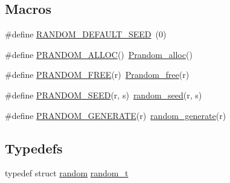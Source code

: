 \subsection*{Macros}
\begin{DoxyCompactItemize}
\item 
\#define \hyperlink{rstm_2rstm-dev_2stamp-0_89_810_2lib_2random_8h_abdb3a124cd7a9321b52cfb9ab44eb3a7}{R\-A\-N\-D\-O\-M\-\_\-\-D\-E\-F\-A\-U\-L\-T\-\_\-\-S\-E\-E\-D}~(0)
\item 
\#define \hyperlink{rstm_2rstm-dev_2stamp-0_89_810_2lib_2random_8h_a78ac6f10caa68d5d98a8b34620a2fade}{P\-R\-A\-N\-D\-O\-M\-\_\-\-A\-L\-L\-O\-C}()~\hyperlink{rstm_2rstm-dev_2stamp-0_89_810_2lib_2random_8h_a23ba58fb29a27e4f5801b2be7b93f0d1}{Prandom\-\_\-alloc}()
\item 
\#define \hyperlink{rstm_2rstm-dev_2stamp-0_89_810_2lib_2random_8h_af42b828b226fd9e7032cc4e4f02e1bda}{P\-R\-A\-N\-D\-O\-M\-\_\-\-F\-R\-E\-E}(r)~\hyperlink{rstm_2rstm-dev_2stamp-0_89_810_2lib_2random_8h_a64d899bb4c137344353c4e0d17bbc61f}{Prandom\-\_\-free}(r)
\item 
\#define \hyperlink{rstm_2rstm-dev_2stamp-0_89_810_2lib_2random_8h_adfeee31d6ffe735494791d7c3d8d5fbd}{P\-R\-A\-N\-D\-O\-M\-\_\-\-S\-E\-E\-D}(r, s)~\hyperlink{rstm_2rstm-dev_2stamp-0_89_810_2lib_2random_8h_a4863f841babe7ce3664a4e4bed6180ab}{random\-\_\-seed}(r, s)
\item 
\#define \hyperlink{rstm_2rstm-dev_2stamp-0_89_810_2lib_2random_8h_a13c0897109ac575de449c5f8a1cd6afa}{P\-R\-A\-N\-D\-O\-M\-\_\-\-G\-E\-N\-E\-R\-A\-T\-E}(r)~\hyperlink{rstm_2rstm-dev_2stamp-0_89_810_2lib_2random_8h_a733bbcfd7d850fa4596d834489b83178}{random\-\_\-generate}(r)
\end{DoxyCompactItemize}
\subsection*{Typedefs}
\begin{DoxyCompactItemize}
\item 
typedef struct \hyperlink{structrandom}{random} \hyperlink{rstm_2rstm-dev_2stamp-0_89_810_2lib_2random_8h_af410e652a1bc8f802b0da971e8b87fad}{random\-\_\-t}
\end{DoxyCompactItemize}
